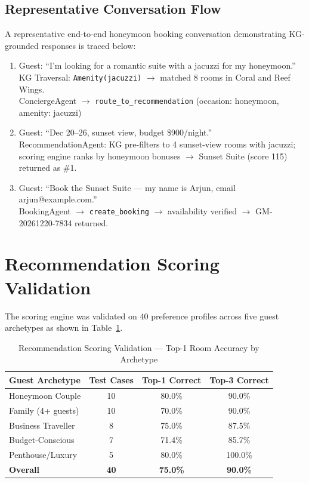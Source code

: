 \documentclass[11pt,a4paper]{report}
\begin{document}
\subsection{Representative Conversation Flow}

A representative end-to-end honeymoon booking conversation demonstrating KG-grounded responses is traced below:

\begin{enumerate}
    \item Guest: ``I'm looking for a romantic suite with a jacuzzi for my honeymoon.''\\
          KG Traversal: \texttt{Amenity(jacuzzi)} $\rightarrow$ matched 8 rooms in Coral and Reef Wings.\\
          ConciergeAgent $\rightarrow$ \texttt{route\_to\_recommendation} (occasion: honeymoon, amenity: jacuzzi)
    \item Guest: ``Dec 20–26, sunset view, budget \$900/night.''\\
          RecommendationAgent: KG pre-filters to 4 sunset-view rooms with jacuzzi; scoring engine ranks by honeymoon bonuses $\rightarrow$ Sunset Suite (score 115) returned as \#1.
    \item Guest: ``Book the Sunset Suite — my name is Arjun, email arjun@example.com.''\\
          BookingAgent $\rightarrow$ \texttt{create\_booking} $\rightarrow$ availability verified $\rightarrow$ GM-20261220-7834 returned.
\end{enumerate}

\section{Recommendation Scoring Validation}

The scoring engine was validated on 40 preference profiles across five guest archetypes as shown in Table~\ref{tab:scoring_val}.

\begin{table}[H]
\centering
\caption{Recommendation Scoring Validation — Top-1 Room Accuracy by Archetype}
\label{tab:scoring_val}
\renewcommand{\arraystretch}{1.4}
\begin{tabular}{lccc}
\toprule
\textbf{Guest Archetype} & \textbf{Test Cases} & \textbf{Top-1 Correct} & \textbf{Top-3 Correct} \\
\midrule
\rowcolor{rowgray}
Honeymoon Couple & 10 & 80.0\% & 90.0\% \\
Family (4+ guests) & 10 & 70.0\% & 90.0\% \\
\rowcolor{rowgray}
Business Traveller & 8 & 75.0\% & 87.5\% \\
Budget-Conscious & 7 & 71.4\% & 85.7\% \\
\rowcolor{rowgray}
Penthouse/Luxury & 5 & 80.0\% & 100.0\% \\
\midrule
\rowcolor{rowgray}
\textbf{Overall} & \textbf{40} & \textbf{75.0\%} & \textbf{90.0\%} \\
\bottomrule
\end{tabular}
\end{table}
\end{document}
